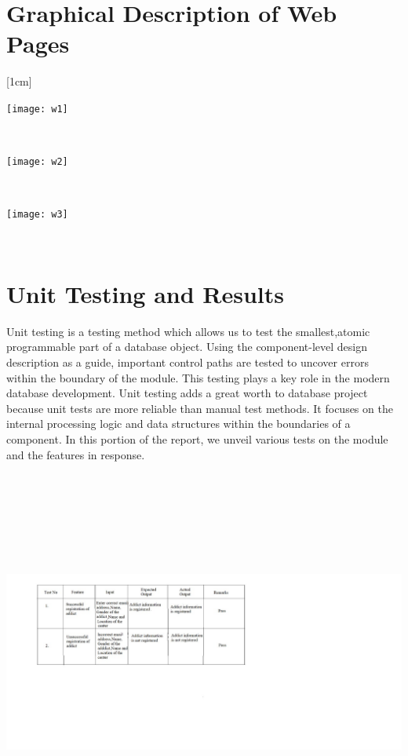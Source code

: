 \documentclass{report}
\begin{document}
\section{Graphical Description of Web Pages}
[1cm]
\centerline{\texttt{[image: w1]}}\\
[1cm]
\centerline{\texttt{[image: w2]}}\\
[1cm]
\centerline{\texttt{[image: w3]}}\\
\section{Unit Testing and Results}
Unit testing is a testing method which allows us to test the smallest,atomic programmable part of a
database object. Using the component-level design description as a guide, important control paths are
tested to uncover errors within the boundary of the module. This testing plays a key role in the modern
database development. Unit testing adds a great worth to database project because unit tests are more
reliable than manual test methods. It focuses on the internal processing logic and data structures within
the boundaries of a component. In this portion of the report, we unveil various tests on the module and the
features  in response.\\
\begin{center}
\centerline{\includegraphics[width=7in,height=5in,keepaspectratio]{test_results}}\\
\end{center}
\end{document}
